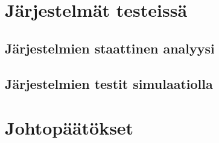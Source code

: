 \documentclass[12pt]{article}
\begin{document}
\section{Järjestelmät testeissä}
\subsection{Järjestelmien staattinen analyysi}

\subsection{Järjestelmien testit simulaatiolla}



\section{Johtopäätökset}


\end{document}

